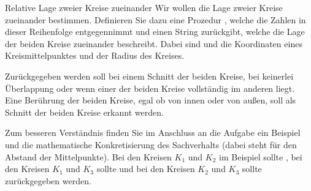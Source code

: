 \documentclass{../tuda-exercise}
\begin{document}
  \clearpage

  \begin{task}[credit=\stars{1}{3}]{Relative Lage zweier Kreise zueinander}
    Wir wollen die Lage zweier Kreise zueinander bestimmen. Definieren Sie dazu eine Prozedur
    , welche die Zahlen  in
    dieser Reihenfolge entgegennimmt und einen String zurückgibt, welche die Lage der beiden
    Kreise zueinander beschreibt. Dabei sind  und  die
    Koordinaten eines Kreismittelpunktes und  der Radius des Kreises.

    \br

    Zurückgegeben werden soll \code{\textcolor{stringcolor}{"'Intersect"'}} bei einem Schnitt der
    beiden Kreise, \code{\textcolor{stringcolor}{"'External"'}} bei keinerlei Überlappung oder
    \code{\textcolor{stringcolor}{"'Interior"'}} wenn einer der beiden Kreise vollständig im
    anderen liegt. Eine Berührung der beiden Kreise, egal ob von innen oder von außen, soll als
    Schnitt der beiden Kreise erkannt werden.

    \br

    Zum besseren Verständnis finden Sie im Anschluss an die Aufgabe ein Beispiel und die
    mathematische Konkretisierung des Sachverhalts (dabei steht  für den Abstand
    der Mittelpunkte). Bei den Kreisen \(K_1\) und \(K_2\) im Beispiel sollte
    \code{\textcolor{stringcolor}{"'Intersect"'}}, bei den Kreisen \(K_1\) und \(K_3\) sollte
    \code{\textcolor{stringcolor}{"'External"'}} und bei den Kreisen \(K_2\) und \(K_3\) sollte
    \code{\textcolor{stringcolor}{"'Interior"'}} zurückgegeben werden.


\end{task}
\end{document}
